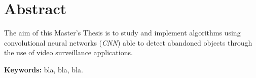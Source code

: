 
\chapter*{Abstract}
\label{cha:abstract}


The aim of this Master's Thesis is to study and implement algorithms using convolutional neural networks (\textit{CNN}) able to detect abandoned objects through the use of video surveillance applications.

\textbf{Keywords:} bla, bla, bla.